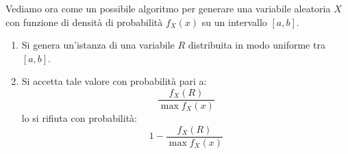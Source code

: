 Vediamo ora come un possibile algoritmo per generare una variabile aleatoria $X$
con funzione di densità di probabilità $f_X(x)$ su un intervallo $[a,b]$.
\begin{enumerate}
    \item Si genera un'istanza di una variabile $R$ distribuita in modo uniforme
          tra $[a,b]$.
    \item Si accetta tale valore con probabilità pari a:
          \begin{equation*}
              \frac{f_X(R)}{\max f_X(x)}
          \end{equation*}
          lo si rifiuta con probabilità:
          \begin{equation*}
              1 - \frac{f_X(R)}{\max f_X(x)}
          \end{equation*}
\end{enumerate}